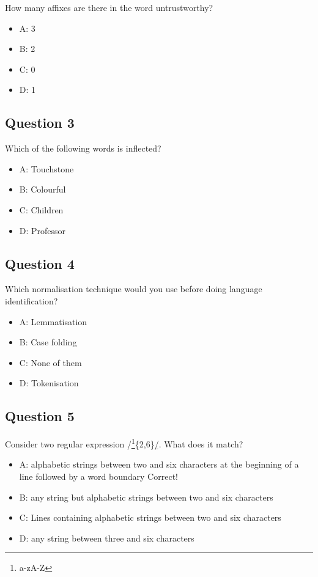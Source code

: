 \documentclass[
  11pt,
  british,
]{article}
\providecommand{\tightlist}{%
  \setlength{\itemsep}{0pt}\setlength{\parskip}{0pt}}
\begin{document}
How many affixes are there in the word untrustworthy?

\begin{itemize}
\tightlist
\item
  A: 3
\item
  B: 2
\item
  C: 0
\item
  D: 1
\end{itemize}

\hypertarget{question-3-2}{%
\subsection{Question 3}\label{question-3-2}}

Which of the following words is inflected?

\begin{itemize}
\tightlist
\item
  A: Touchstone
\item
  B: Colourful
\item
  C: Children
\item
  D: Professor
\end{itemize}

\hypertarget{question-4-2}{%
\subsection{Question 4}\label{question-4-2}}

Which normalisation technique would you use before doing language
identification?

\begin{itemize}
\tightlist
\item
  A: Lemmatisation
\item
  B: Case folding
\item
  C: None of them
\item
  D: Tokenisation
\end{itemize}

\hypertarget{question-5-2}{%
\subsection{Question 5}\label{question-5-2}}

Consider two regular expression /\footnote{a-zA-Z}\{2,6\}\b/. What does
it match?

\begin{itemize}
\tightlist
\item
  A: alphabetic strings between two and six characters at the beginning
  of a line followed by a word boundary Correct!
\item
  B: any string but alphabetic strings between two and six characters
\item
  C: Lines containing alphabetic strings between two and six characters
\item
  D: any string between three and six characters
\end{itemize}
\end{document}
